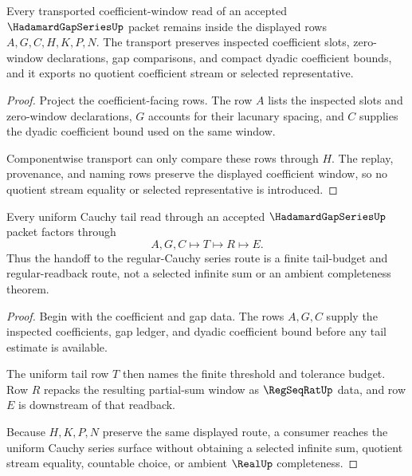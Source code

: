 \begin{theorem}
\label{thm:hadamard-gap-series-coefficient-window-stability}
Every transported coefficient-window read of an accepted $\HadamardGapSeriesUp$ packet remains inside the displayed rows $A,G,C,H,K,P,N$. The transport preserves inspected coefficient slots, zero-window declarations, gap comparisons, and compact dyadic coefficient bounds, and it exports no quotient coefficient stream or selected representative.
\end{theorem}
\begin{proof}
Project the coefficient-facing rows. The row $A$ lists the inspected slots and zero-window declarations, $G$ accounts for their lacunary spacing, and $C$ supplies the dyadic coefficient bound used on the same window.

Componentwise transport can only compare these rows through $H$. The replay, provenance, and naming rows preserve the displayed coefficient window, so no quotient stream equality or selected representative is introduced.
\end{proof}

\begin{theorem}
\label{thm:hadamard-gap-series-uniform-tail-handoff}
Every uniform Cauchy tail read through an accepted $\HadamardGapSeriesUp$ packet factors through
$$
A,G,C \longmapsto T \longmapsto R \longmapsto E .
$$
Thus the handoff to the regular-Cauchy series route is a finite tail-budget and regular-readback route, not a selected infinite sum or an ambient completeness theorem.
\end{theorem}
\begin{proof}
Begin with the coefficient and gap data. The rows $A,G,C$ supply the inspected coefficients, gap ledger, and dyadic coefficient bound before any tail estimate is available.

The uniform tail row $T$ then names the finite threshold and tolerance budget. Row $R$ repacks the resulting partial-sum window as $\RegSeqRatUp$ data, and row $E$ is downstream of that readback.

Because $H,K,P,N$ preserve the same displayed route, a consumer reaches the uniform Cauchy series surface without obtaining a selected infinite sum, quotient stream equality, countable choice, or ambient $\RealUp$ completeness.
\end{proof}

